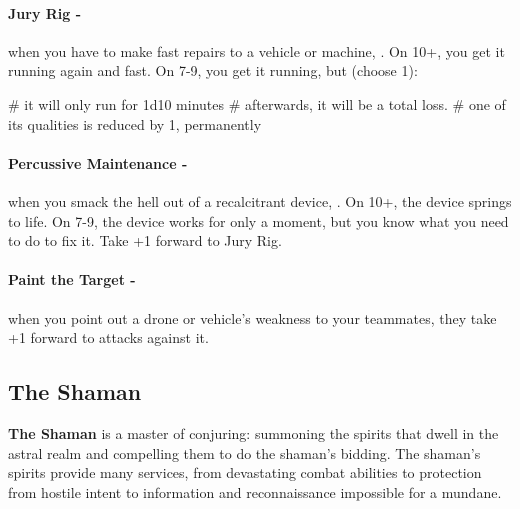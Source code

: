 \paragraph{Jury Rig -} when you have to make fast repairs to a vehicle or machine, . On 10+, you get it running again and fast. On 7-9, you get it running, but (choose 1):
    \begin{easylist}
        # it will only run for 1d10 minutes
        # afterwards, it will be a total loss.
        # one of its qualities is reduced by 1, permanently
    \end{easylist}

\paragraph{Percussive Maintenance -} when you smack the hell out of a recalcitrant device, . On 10+, the device springs to life. On 7-9, the device works for only a moment, but you know what you need to do to fix it. Take +1 forward to Jury Rig.

\paragraph{Paint the Target -} when you point out a drone or vehicle’s weakness to your teammates, they take +1 forward to attacks against it.



\clearpage
\subsection{The Shaman}
\textbf{The Shaman} is a master of conjuring: summoning the spirits that dwell in the astral realm and compelling them to do the shaman’s bidding. The shaman’s spirits provide many services, from devastating combat abilities to protection from hostile intent to information and reconnaissance impossible for a mundane.

